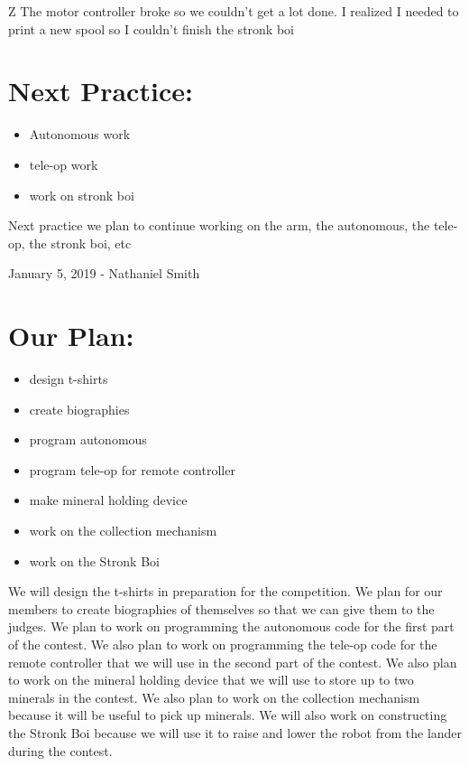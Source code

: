 \documentclass[12pt]{article}
\begin{document}
Z The motor controller broke so we couldn't get a lot done. I realized I needed to print a new spool so I couldn't finish the stronk boi

\section{Next Practice:}
\begin{itemize}
	\item Autonomous work
\item tele-op work
\item work on stronk boi
\end{itemize}

Next practice we plan to continue working on the arm, the autonomous, the tele-op, the stronk boi, etc

\newpage
\setcounter{section}{0}

January 5, 2019 - Nathaniel Smith

\section{Our Plan:} %
\begin{itemize}
	\item design t-shirts
\item create biographies
\item program autonomous
\item program tele-op for remote controller
\item make mineral holding device
\item work on the collection mechanism
\item work on the Stronk Boi
\end{itemize}

We will design the t-shirts in preparation for the competition. We plan for our members to create biographies of themselves so that we can give them to the judges. We plan to work on programming the autonomous code for the first part of the contest. We also plan to work on programming the tele-op code for the remote controller that we will use in the second part of the contest. We also plan to work on the mineral holding device that we will use to store up to two minerals in the contest. We also plan to work on the collection mechanism because it will be useful to pick up minerals. We will also work on constructing the Stronk Boi because we will use it to raise and lower the robot from the lander during the contest.
\end{document}

